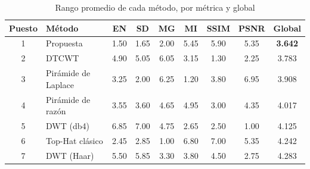 \begin{table}[htbp]
\centering
\caption{Rango promedio de cada método, por métrica y global}
\label{tab:ranking_seis}
\begin{tabular}{clccccccc}
\toprule
\textbf{Puesto} & \textbf{Método} & \textbf{EN} & \textbf{SD} & \textbf{MG} & \textbf{MI} & \textbf{SSIM} & \textbf{PSNR} & \textbf{Global} \\
\midrule
1 & Propuesta & 1.50 & 1.65 & 2.00 & 5.45 & 5.90 & 5.35 & \textbf{3.642} \\
2 & DTCWT & 4.90 & 5.05 & 6.05 & 3.15 & 1.30 & 2.25 & 3.783 \\
3 & Pirámide de Laplace & 3.25 & 2.00 & 6.25 & 1.20 & 3.80 & 6.95 & 3.908 \\
4 & Pirámide de razón & 3.55 & 3.60 & 4.65 & 4.95 & 3.00 & 4.35 & 4.017 \\
5 & DWT (db4) & 6.85 & 7.00 & 4.75 & 2.65 & 2.50 & 1.00 & 4.125 \\
6 & Top-Hat clásico & 2.45 & 2.85 & 1.00 & 6.80 & 7.00 & 5.35 & 4.242 \\
7 & DWT (Haar) & 5.50 & 5.85 & 3.30 & 3.80 & 4.50 & 2.75 & 4.283 \\
\bottomrule
\end{tabular}
\end{table}
